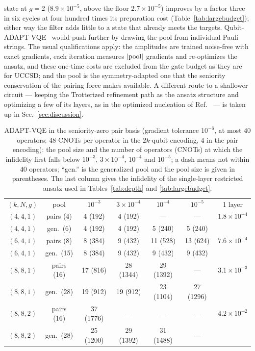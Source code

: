 \documentclass[
  aps,            %
  prc,            %
  reprint,        %
  superscriptaddress,
  floatfix,
  nofootinbib
]{revtex4-2}
\begin{document}
state at $g=2$ ($8.9\times10^{-5}$, above the floor $2.7\times10^{-5}$)
improves by a factor three in six cycles at four hundred times its
preparation cost (Table~\ref{tab:largebudget}); either way the filter adds
little to a state that already meets the targets.  Qubit-ADAPT-VQE~\cite{Tang2021}
would push further by drawing the pool from individual Pauli strings.  The
usual qualifications apply: the amplitudes are trained noise-free with
exact gradients, each iteration measures $\abs{\rm pool}$ gradients and
re-optimizes the ansatz, and these one-time costs are excluded from the
gate budget as they are for UCCSD; and the pool is the symmetry-adapted one
that the seniority conservation of the pairing force makes available.  A
different route to a shallower circuit --- keeping the Trotterized
refinement path as the ansatz structure and optimizing a few of its layers,
as in the optimized nucleation of Ref.~\cite{Sadia2026} --- is taken up in
Sec.~\ref{sec:discussion}.

\begin{table}[t]
\caption{\label{tab:adapt}ADAPT-VQE in the seniority-zero pair basis
(gradient tolerance $10^{-6}$, at most $40$ operators; $48$ CNOTs per
operator in the $2k$-qubit encoding, $4$ in the pair encoding): the pool
size and the number of operators (CNOTs) at which the infidelity first
falls below $10^{-3}$, $3\times10^{-4}$, $10^{-4}$ and $10^{-5}$; a dash
means not within $40$ operators; ``gen.'' is the generalized pool and the
pool size is given in parentheses.  The
last column gives the infidelity of the single-layer restricted ansatz used
in Tables~\ref{tab:depth} and \ref{tab:largebudget}.}
\footnotesize
\begin{ruledtabular}
\begin{tabular}{cc cccc c}
$(k,N,g)$ & pool & $10^{-3}$ & $3{\times}10^{-4}$ & $10^{-4}$ & $10^{-5}$ & 1 layer\\
\colrule
$(4,4,1)$ & pairs (4) & 4 (192) & 4 (192) & --- & --- & $1.8\times10^{-4}$\\
$(4,4,1)$ & gen.\ (6) & 4 (192) & 4 (192) & 5 (240) & 5 (240) & \\
$(6,4,1)$ & pairs (8) & 8 (384) & 9 (432) & 11 (528) & 13 (624) & $7.6\times10^{-4}$\\
$(6,4,1)$ & gen.\ (15) & 8 (384) & 9 (432) & 9 (432) & 9 (432) & \\
$(8,8,1)$ & pairs (16) & 17 (816) & 28 (1344) & 29 (1392) & --- & $3.1\times10^{-3}$\\
$(8,8,1)$ & gen.\ (28) & 19 (912) & 19 (912) & 23 (1104) & 27 (1296) & \\
$(8,8,2)$ & pairs (16) & 37 (1776) & --- & --- & --- & $4.2\times10^{-2}$\\
$(8,8,2)$ & gen.\ (28) & 25 (1200) & 29 (1392) & 31 (1488) & --- & \\
\end{tabular}
\end{ruledtabular}
\end{table}
\end{document}
